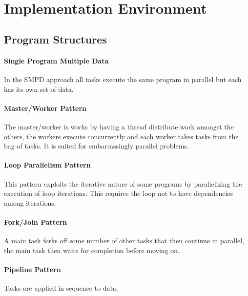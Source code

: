 \section{Implementation Environment}

\subsection{Program Structures}

\paragraph{Single Program Multiple Data}
In the SMPD approach all tasks execute the same program in parallel but each has its own set of data.

\paragraph{Master/Worker Pattern}
The master/worker is works by having a thread distribute work amongst the others,
the workers execute concurrently and each worker takes tasks from the bag of tasks.
It is suited for embarrassingly parallel problems.

\paragraph{Loop Parallelism Pattern}
This pattern exploits the iterative nature of some programs by parallelizing the execution of loop iterations.
This requires the loop not to have dependencies among iterations.

\paragraph{Fork/Join Pattern}
A main task forks off some number of other tasks that then continue in parallel, the main task then waits for completion before moving on.

\paragraph{Pipeline Pattern}
Tasks are applied in sequence to data.
